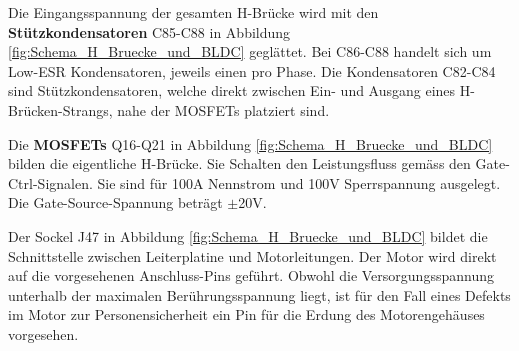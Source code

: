 Die Eingangsspannung der gesamten H-Brücke wird mit den \textbf{Stützkondensatoren} C85-C88 in Abbildung \ref{fig:Schema_H_Bruecke_und_BLDC} geglättet.
Bei C86-C88 handelt sich um Low-ESR Kondensatoren, jeweils einen pro Phase.
Die Kondensatoren C82-C84 sind Stützkondensatoren, welche direkt zwischen Ein- und Ausgang eines H-Brücken-Strangs, nahe der MOSFETs platziert sind.

Die \textbf{MOSFETs} Q16-Q21 in Abbildung \ref{fig:Schema_H_Bruecke_und_BLDC} bilden die eigentliche H-Brücke. Sie Schalten den Leistungsfluss gemäss den Gate-Ctrl-Signalen. Sie sind für 100A Nennstrom und 100V Sperrspannung ausgelegt. Die Gate-Source-Spannung beträgt $\pm$20V.

Der Sockel J47 in Abbildung \ref{fig:Schema_H_Bruecke_und_BLDC} bildet die Schnittstelle zwischen Leiterplatine und Motorleitungen. Der Motor wird direkt auf die vorgesehenen Anschluss-Pins geführt. Obwohl die Versorgungsspannung unterhalb der maximalen Berührungsspannung liegt, ist für den Fall eines Defekts im Motor zur Personensicherheit ein Pin für die Erdung des Motorengehäuses vorgesehen.